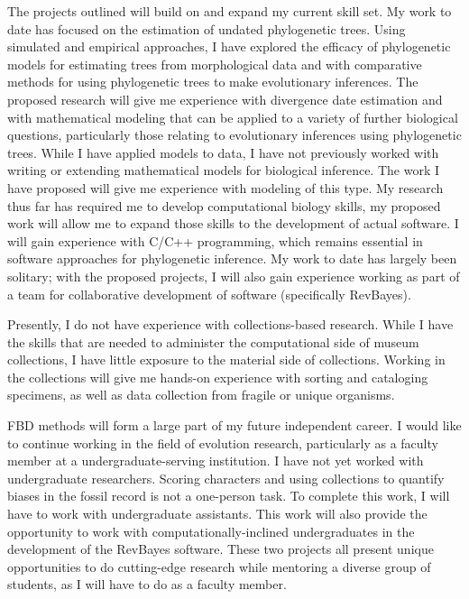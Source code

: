 \documentclass[]{article}
\begin{document}
   The  projects outlined will build on and expand my current skill set. My work to date has focused on the estimation of undated phylogenetic trees. Using simulated and empirical approaches, I have explored the efficacy of phylogenetic models for estimating trees from morphological data \citep{wright2014bayesian} and with comparative methods \citep{wright2015came, meirelles2015shared} for using phylogenetic trees to make evolutionary inferences. The proposed research will give me experience with divergence date estimation and with mathematical modeling that can be applied to a variety of further biological questions, particularly those relating to evolutionary inferences using phylogenetic trees. While I have applied models to data, I have not previously worked with writing or extending mathematical models for biological inference. The work I have proposed will give me experience with modeling of this type. My research thus far has required me to develop computational biology skills, my proposed work will allow me to expand those skills to the development of actual software. I will gain experience with C/C++ programming, which remains essential in software approaches for phylogenetic inference. My work to date has largely been solitary; with the proposed projects, I will also gain experience working as part of a team for collaborative development of software (specifically RevBayes). \par
Presently, I do not have experience with collections-based research. While I have the skills that are needed to administer the computational side of museum collections, I have little exposure to the material side of collections. Working in the collections will give me hands-on experience with sorting and cataloging specimens, as well as data collection from fragile or unique organisms. \par
FBD methods will form a large part of my future independent career. I would like to continue working in the field of evolution research, particularly as a faculty member at a undergraduate-serving institution. I have not yet worked with undergraduate researchers. Scoring characters and using collections to quantify biases in the fossil record is not a one-person task. To complete this work, I will have to work with undergraduate assistants. This work will also provide the opportunity to work with computationally-inclined undergraduates in the development of the RevBayes software. These  two projects all present unique opportunities to do cutting-edge research while mentoring a diverse group of students, as I will have to do as a faculty member. \par	
	
\end{document}
